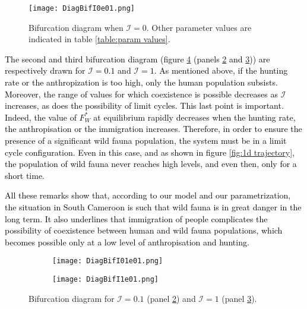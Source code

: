 \documentclass{article}
\newcommand{\lfw}{\lambda_{F}}
\newcommand{\lfw}{\lambda_{F}}
\newcommand{\cI}{\mathcal{I}}
\newcommand{\vdeux}[1]{\textcolor{black}{#1}}
\newcommand{\vtrois}[1]{\textcolor{black}{#1}}
\theoremstyle{definition}
\theoremstyle{remark}
\begin{document}
\begin{figure}[!ht]
\centering
\texttt{[image: DiagBifI0e01.png]}
\caption{Bifurcation diagram when $\cI = 0$. Other parameter values are indicated in table \ref{table:param values}.}
\label{fig:bifurcation, I=0}
\end{figure}



\vdeux{
The second and third bifurcation diagram (figure \ref{fig:bifurcation, I>0} (panels \ref{fig:bifurcation, I=0.5} and \ref{fig:bifurcation, I=1})) are respectively drawn for $\cI = 0.1$ and $\cI = 1$. As mentioned above, if the hunting rate or the anthropization is too high, only the human population subsists. Moreover, the range of values for which coexistence is possible decreases as $\cI$ increases, as does the possibility of limit cycles. This last point is important. Indeed, the value of $F_W^*$ at equilibrium rapidly decreases when the hunting rate, the anthropisation or the immigration increases. Therefore, in order to ensure the presence of a significant wild fauna population, the system must be in a limit cycle configuration. Even in this case, and as shown in figure \ref{fig:1d trajectory}, the population of wild fauna never reaches high levels, and even then, only for a short time.
}

\vdeux{All these \vtrois{remarks} show that, according to our model and our parametrization, the situation in South Cameroon is such that wild fauna is in great danger in the long term. It also underlines that immigration of people complicates the possibility of coexistence between human and wild fauna populations, which becomes possible only at a low level of anthropisation and hunting.}

\begin{figure}[!ht]
\centering
\begin{subfigure}{1\textwidth}
\texttt{[image: DiagBifI01e01.png]}
\caption{}
\label{fig:bifurcation, I=0.5}
\end{subfigure}
\begin{subfigure}{1\textwidth}
\centering
\texttt{[image: DiagBifI1e01.png]}
\caption{}
\label{fig:bifurcation, I=1}
\end{subfigure}
\caption{Bifurcation diagram for $\cI = 0.1$ (panel \ref{fig:bifurcation, I=0.5}) and $\cI = 1$ (panel \ref{fig:bifurcation, I=1}).}
\label{fig:bifurcation, I>0}
\end{figure}

\end{document}
